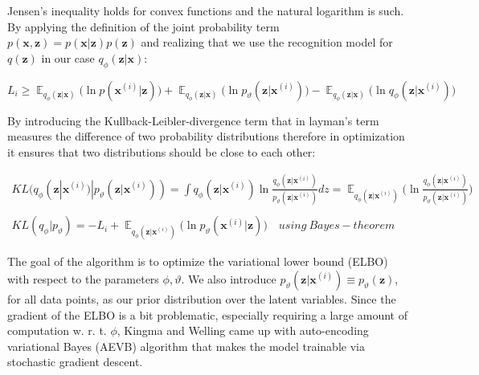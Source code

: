 \documentclass[12pt, english]{article}
\DeclareMathOperator*{\E}{\mathbb{E}}
\begin{document}
\par Jensen's inequality holds for convex functions and the natural logarithm is such. By applying the definition of the joint probability term $p(\bm{x}, \bm{z}) = p(\bm{x} | \bm{z})p(\bm{z})$ and realizing that we use the recognition model for $q(\bm{z})$ in our case $q_{\phi}(\bm{z} | \bm{x})$:

\vspace{4mm}

\begin{equation}
    L_{i} \geq \E_{q_{\phi}(\bm{z} | \bm{x})} \Big( \ln p(\bm{x}^{(i)} | \bm{z}) \Big) + \E_{q_{\phi}(\bm{z} | \bm{x})} \Big( \ln p_{\vartheta}(\bm{z} | \bm{x}^{(i)}) \Big) - \E_{q_{\phi}(\bm{z} | \bm{x})} \Big( \ln q_{\phi}(\bm{z} | \bm{x}^{(i)}) \Big)
\end{equation}

\vspace{4mm}

\par By introducing the Kullback-Leibler-divergence term that in layman's term measures the difference of two probability distributions therefore in optimization it ensures that two distributions should be close to each other:

\vspace{4mm}

\begin{gather*}
    KL(q_{\phi}(\bm{z} | \bm{x}^{(i)}) | p_{\vartheta}(\bm{z} | \bm{x}^{(i)})) = \int q_{\phi}(\bm{z} | \bm{x}^{(i)})\ln \frac{q_{\phi}(\bm{z} | \bm{x}^{(i)})}{p_{\vartheta}(\bm{z} | \bm{x}^{(i)})}dz = \E_{q_{\phi}(\bm{z} | \bm{x}^{(i)})} \Big( \ln \frac{q_{\phi}(\bm{z} | \bm{x}^{(i)})}{p_{\vartheta}(\bm{z}|\bm{x}^{(i)})}  \Big) \\ \\
    KL(q_{\phi} | p_{\vartheta}) = -L_{i} + \E_{q_{\phi}(\bm{z} | \bm{x}^{(i)})} \Big( \ln p_{\vartheta}(\bm{x}^{(i)} | \bm{z}) \Big) \quad using\ Bayes-theorem
\end{gather*}

\vspace{4mm}

\par The goal of the algorithm is to optimize the variational lower bound (ELBO) with respect to the parameters $\phi, \vartheta$. We also introduce $p_{\vartheta}(\bm{z} | \bm{x}^{(i)}) \equiv p_{\vartheta}(\bm{z})$, for all data points, as our prior distribution over the latent variables. Since the gradient of the ELBO is a bit problematic, especially requiring a large amount of computation w. r. t. $\phi$, Kingma and Welling came up with auto-encoding variational Bayes (AEVB) algorithm that makes the model trainable via stochastic gradient descent.
\end{document}
